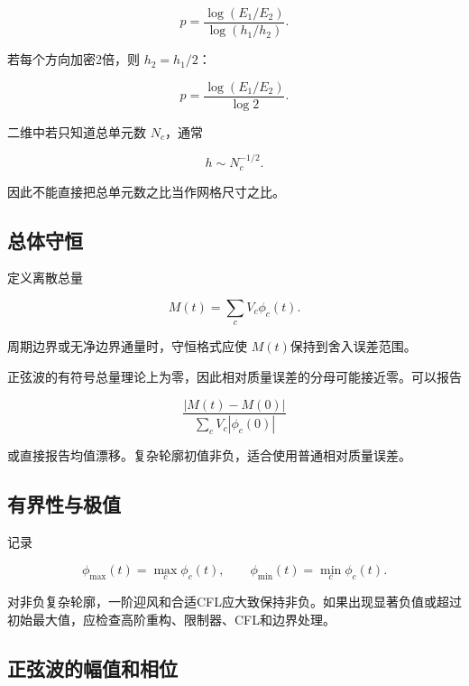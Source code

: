 \documentclass[UTF8,12pt,a4paper,fontset=fandol]{ctexart}
\numberwithin{equation}{section}
\begin{document}
\begin{equation}
  p
  =
  \frac{\log(E_1/E_2)}
  {\log(h_1/h_2)}.
\end{equation}

若每个方向加密2倍，则 $h_2=h_1/2$：

\begin{equation}
  p
  =
  \frac{\log(E_1/E_2)}{\log2}.
\end{equation}

二维中若只知道总单元数 $N_c$，通常

\begin{equation}
  h\sim N_c^{-1/2}.
\end{equation}

因此不能直接把总单元数之比当作网格尺寸之比。

\subsection{总体守恒}

定义离散总量

\begin{equation}
  M(t)=\sum_cV_c\phi_c(t).
\end{equation}

周期边界或无净边界通量时，守恒格式应使 $M(t)$保持到舍入误差范围。

正弦波的有符号总量理论上为零，因此相对质量误差的分母可能接近零。可以报告

\begin{equation}
  \frac{|M(t)-M(0)|}
  {\sum_cV_c|\phi_c(0)|}
\end{equation}

或直接报告均值漂移。复杂轮廓初值非负，适合使用普通相对质量误差。

\subsection{有界性与极值}

记录

\begin{equation}
  \phi_{\max}(t)=\max_c\phi_c(t),
  \qquad
  \phi_{\min}(t)=\min_c\phi_c(t).
\end{equation}

对非负复杂轮廓，一阶迎风和合适CFL应大致保持非负。如果出现显著负值或超过初始最大值，应检查高阶重构、限制器、CFL和边界处理。

\subsection{正弦波的幅值和相位}
\end{document}
